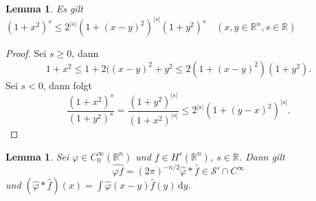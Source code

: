 \documentclass[
paper=a4,
bibtotocnumbered,
liststotocnumbered,
tablecaptionabove,
pointlessnumbers,
twoside,
openright,
10pt
]
{report}
\let\phi\varphi
\newtheorem{lem}[thm]{Lemma}
\theoremstyle{definition}
\numberwithin{equation}{chapter}
\begin{document}
\begin{lem}
Es gilt $(1+x^2)^s\le 2^{|s|} (1+(x-y)^2)^{|s|} (1+y^2)^s \quad (x,y\in \mathbb R^n, s\in \mathbb R)$
\end{lem}
\begin{proof}
Sei $s\ge 0$, dann 
\begin{equation}
1+x^2 \le 1+ 2((x-y)^2+y^2 \le 2 (1+(x-y)^2)(1+y^2).
\end{equation}
Sei $s < 0$, dann folgt
\begin{equation}
\frac{(1+x^2)^s}{(1+y^2)^s} = \frac{(1+y^2)^{|s|}}{(1+x^2)^{|s|}} \le 2^{|s|} (1+(y-x)^2)^{|s|}.
\end{equation}
\end{proof}
\begin{lem}
Sei $\phi \in C_0^\infty (\mathbb R^n)$ und $f\in H^s(\mathbb R^n)$, $s\in \mathbb R$. Dann gilt
\begin{equation}
\widehat{\phi f} = (2\pi)^{-n/2} \hat \phi * \hat f\in \mathcal S' \cap C^\infty
\end{equation}
und $(\hat \phi * \hat f) (x) = \int \hat \phi(x-y) \hat f(y)\, \mathrm dy$.
\end{lem}
\end{document}
